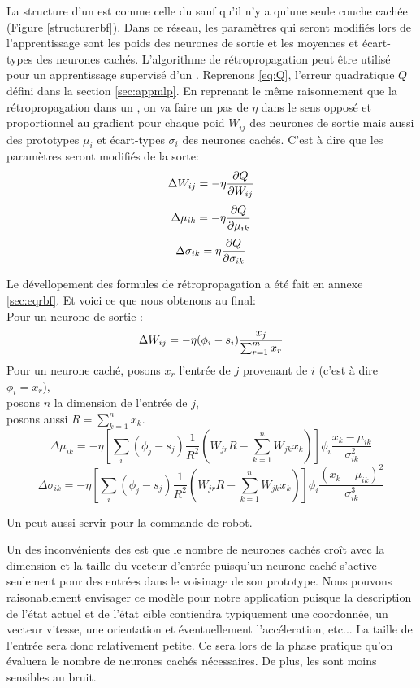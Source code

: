 La structure d'un \rbf est comme celle du \mlp sauf qu'il n'y a qu'une seule couche cachée (Figure \ref{structurerbf}).
Dans ce réseau, les paramètres qui seront modifiés lors de l'apprentissage sont les poids des neurones de sortie et les moyennes et écart-types des neurones cachés.
L'algorithme de rétropropagation peut être utilisé pour un apprentissage supervisé d'un \rbf.
Reprenons \eqref{eq:Q}, l'erreur quadratique $Q$ défini dans la section \ref{sec:appmlp}.
En reprenant le même raisonnement que la rétropropagation dans un \mlp,
on va faire un pas de $\eta$ dans le sens opposé et proportionnel au gradient pour chaque poid $W_{ij}$ des neurones de sortie mais aussi des prototypes $\mu_i$ et écart-types $\sigma_i$ des neurones cachés.
C'est à dire que les paramètres seront modifiés de la sorte:
\begin{equation}%
 \Delta W_{ij} = -\eta \partiel{Q}{W_{ij}}
\end{equation}
\begin{equation}%
 \Delta \mu_{ik} = -\eta \partiel{Q}{\mu_{ik}}
\end{equation}
\begin{equation}%
 \Delta \sigma_{ik} = \eta \partiel{Q}{\sigma_{ik}}
\end{equation}

Le dévellopement des formules de rétropropagation a été fait en annexe \ref{sec:eqrbf}.
Et voici ce que nous obtenons au final:\\
Pour un neurone de sortie :
\[\Delta W_{ij} = -\eta (\phi_i - s_i) \frac{x_j}{\sum_{r=1}^{m}x_{r}}\]
Pour un neurone caché, posons $x_r$ l'entrée de $j$ provenant de $i$ (c'est à dire $\phi_i = x_r$),\\
posons $n$ la dimension de l'entrée de $j$,\\
posons aussi $R = \sum_{k=1}^{n}x_k$.
\[\Delta\mu_{ik} = -\eta \left[\sum_{i}(\phi_j - s_j) \frac{1}{R^2} \left(W_{jr}R - \sum_{k=1}^{n}W_{jk}x_k\right)\right] \phi_i\frac{x_k-\mu_{ik}}{\sigma_{ik}^2}\]
\[\Delta \sigma_{ik} = -\eta \left[\sum_{i}(\phi_j - s_j) \frac{1}{R^2} \left(W_{jr}R - \sum_{k=1}^{n}W_{jk}x_k\right)\right] \phi_i \frac{(x_k-\mu_{ik})^2}{\sigma_{ik}^3}\]

Un \rbf peut aussi servir pour la commande de robot.\cite{Gauthier}

Un des inconvénients des \rbf est que le nombre de neurones cachés croît avec la dimension et la taille du vecteur d'entrée puisqu'un neurone caché s'active seulement pour des entrées dans le voisinage de son prototype.
Nous pouvons raisonablement envisager ce modèle pour notre application puisque la description de l'état actuel et de l'état cible contiendra typiquement une coordonnée, un vecteur vitesse, une orientation et éventuellement l'accéleration, etc...
La taille de l'entrée sera donc relativement petite. Ce sera lors de la phase pratique qu'on évaluera le nombre de neurones cachés nécessaires.
De plus, les \rbf sont moins sensibles au bruit.\cite{adversarial}
